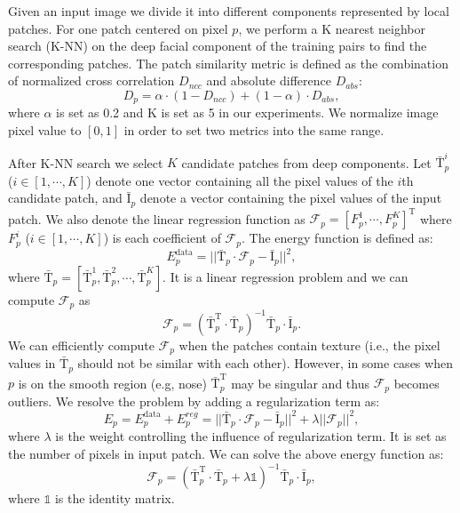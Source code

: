 \documentclass{article}
\begin{document}
Given an input image we divide it into different components represented by local patches. For one patch centered on pixel $p$, we perform a K nearest neighbor search (K-NN) on the deep facial component of the training pairs to find the corresponding patches. The patch similarity metric is defined as the combination of normalized cross correlation $D_{ncc}$ and absolute difference $D_{abs}$:
\begin{equation}
D_p=\alpha\cdot(1-D_{ncc})+(1-\alpha)\cdot D_{abs},
\label{eq:ncc_abs}
\end{equation}
where $\alpha$ is set as 0.2 and K is set as 5 in our experiments. We normalize image pixel value to $[0,1]$ in order to set two metrics into the same range.

After K-NN search we select $K$ candidate patches from deep components. Let $\bar{\mathrm{T}}_p^i$ ($i\in[1,\cdots,K]$) denote one vector containing all the pixel values of the $i$th candidate patch, and $\bar{\mathrm{I}}_p$ denote a vector containing the pixel values of the input patch. We also denote the linear regression function as $\mathcal{F}_p=[F_p^1,\cdots,F_p^K]^\mathrm{T}$ where $F_p^i$ ($i\in[1,\cdots,K]$) is each coefficient of $\mathcal{F}_p$. The energy function is defined as:
\begin{equation}
E_p^{\mathrm{data}}=||\bar{\mathrm{T}}_p\cdot\mathcal{F}_p-\bar{\mathrm{I}}_p||^2,
\label{eq:energy_data}
\end{equation}
where $\bar{\mathrm{T}}_p=[\bar{\mathrm{T}}_p^1,\bar{\mathrm{T}}_p^2,\cdots,\bar{\mathrm{T}}_p^K]$. It is a linear regression problem and we can compute $\mathcal{F}_p$ as
\begin{equation}
\mathcal{F}_p=(\bar{\mathrm{T}}_p^\mathrm{T}\cdot\bar{\mathrm{T}}_p)^{-1}\bar{\mathrm{T}}_p\cdot\bar{\mathrm{I}}_p.
\label{eq:solver}
\end{equation}
We can efficiently compute $\mathcal{F}_p$ when the patches contain texture (i.e., the pixel values in $\bar{\mathrm{T}}_p$ should not be similar with each other). However, in some cases when $p$ is on the smooth region (e.g, nose) $\bar{\mathrm{T}}_p^\mathrm{T}$ may be singular and thus $\mathcal{F}_p$ becomes outliers. We resolve the problem by adding a regularization term as:
\begin{equation}
E_p = E_p^{\mathrm{data}}+E_p^{reg} = ||\bar{\mathrm{T}}_p\cdot\mathcal{F}_p-\bar{\mathrm{I}}_p||^2+\lambda ||\mathcal{F}_p||^2,
\end{equation}
where $\lambda$ is the weight controlling the influence of regularization term. It is set as the number of pixels in input patch. We can solve the above energy function as:
\begin{equation}
\mathcal{F}_p=(\bar{\mathrm{T}}_p^\mathrm{T}\cdot\bar{\mathrm{T}}_p+\lambda\mathds{1})^{-1}\bar{\mathrm{T}}_p\cdot\bar{\mathrm{I}}_p,
\label{eq:solver_final}
\end{equation}
where $\mathds{1}$ is the identity matrix.
\end{document}
